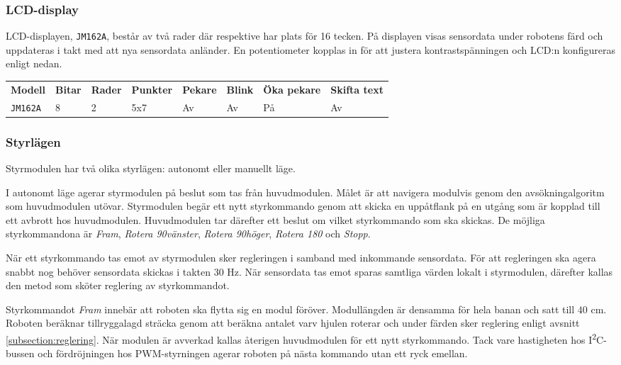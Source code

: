 \documentclass[11pt]{article}
\begin{document}
\begin{flushleft}
\subsubsection{LCD-display}
LCD-displayen, \verb+JM162A+, består av två rader där respektive har plats för 16 tecken. På displayen visas sensordata under robotens färd och uppdateras i takt med att nya sensordata anländer. En potentiometer kopplas in för att justera kontrastspänningen och LCD:n konfigureras enligt nedan.

\begin{center}
  \begin{tabular}{l l l l l l l l}
      \textbf{Modell} & \textbf{Bitar} & \textbf{Rader} & \textbf{Punkter} & \textbf{Pekare} & \textbf{Blink} & \textbf{Öka pekare} & \textbf{Skifta text} \\
      \verb+JM162A+ & 8 & 2 & 5x7 & Av & Av & På & Av \\
    \end{tabular}
  \end{center}

\subsubsection{Styrlägen}
Styrmodulen har två olika styrlägen: autonomt eller manuellt läge.
\begin{description}[style=unboxed, leftmargin=0cm]
  \item[Autonomt läge]
I autonomt läge agerar styrmodulen på beslut som tas från huvudmodulen. Målet är att navigera modulvis genom den avsökningalgoritm som huvudmodulen utövar. Styrmodulen begär ett nytt styrkommando genom att skicka en uppåtflank på en utgång som är kopplad till ett avbrott hos huvudmodulen. Huvudmodulen tar därefter ett beslut om vilket styrkommando som ska skickas. De möjliga styrkommandona är \textit{Fram}, \textit{Rotera 90\textdegree vänster}, \textit{Rotera 90\textdegree höger}, \textit{Rotera 180\textdegree} och \textit{Stopp}. 

När ett styrkommando tas emot av styrmodulen sker regleringen i samband med inkommande sensordata. För att regleringen ska agera snabbt nog behöver sensordata skickas i takten $30$ Hz. När sensordata tas emot sparas samtliga värden lokalt i styrmodulen, därefter kallas den metod som sköter reglering av styrkommandot. 

Styrkommandot \textit{Fram} innebär att roboten ska flytta sig en modul föröver. Modullängden är densamma för hela banan och satt till $40$ cm. Roboten beräknar tillryggalagd sträcka genom att beräkna antalet varv hjulen roterar och under färden sker reglering enligt avsnitt \ref{subsection:reglering}. När modulen är avverkad kallas återigen huvudmodulen för ett nytt styrkommando. Tack vare hastigheten hos I\textsuperscript{2}C-bussen och fördröjningen hos PWM-styrningen agerar roboten på nästa kommando utan ett ryck emellan. 


\end{description}
\end{flushleft}
\end{document}
